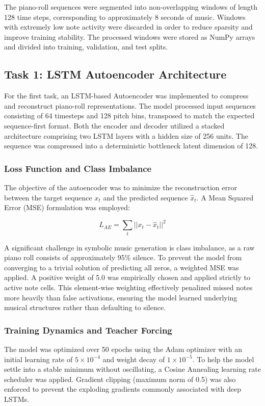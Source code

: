 \documentclass{article}
\theoremstyle{plain}
\theoremstyle{definition}
\theoremstyle{remark}
\begin{document}
The piano-roll sequences were segmented into non-overlapping windows of length 128 time steps, corresponding to approximately 8 seconds of music. Windows with extremely low note activity were discarded in order to reduce sparsity and improve training stability. The processed windows were stored as NumPy arrays and divided into training, validation, and test splits.

\subsection{Task 1: LSTM Autoencoder Architecture}

For the first task, an LSTM-based Autoencoder \cite{hochreiter1997lstm} was implemented to compress and reconstruct piano-roll representations. The model processed input sequences consisting of 64 timesteps and 128 pitch bins, transposed to match the expected sequence-first format. Both the encoder and decoder utilized a stacked architecture comprising two LSTM layers with a hidden size of 256 units. The sequence was compressed into a deterministic bottleneck latent dimension of 128.

\subsubsection{Loss Function and Class Imbalance}

The objective of the autoencoder was to minimize the reconstruction error between the target sequence $x_t$ and the predicted sequence $\hat{x}_t$. A Mean Squared Error (MSE) formulation was employed:

$$
L_{AE} = \sum_t || x_t - \hat{x}_t ||^2
$$

A significant challenge in symbolic music generation is class imbalance, as a raw piano roll consists of approximately 95\% silence. To prevent the model from converging to a trivial solution of predicting all zeros, a weighted MSE was applied. A positive weight of 5.0 was empirically chosen and applied strictly to active note cells. This element-wise weighting effectively penalized missed notes more heavily than false activations, ensuring the model learned underlying musical structures rather than defaulting to silence.

\subsubsection{Training Dynamics and Teacher Forcing}

The model was optimized over 50 epochs using the Adam optimizer with an initial learning rate of $5 \times 10^{-4}$ and weight decay of $1 \times 10^{-5}$. To help the model settle into a stable minimum without oscillating, a Cosine Annealing learning rate scheduler was applied. Gradient clipping (maximum norm of 0.5) was also enforced to prevent the exploding gradients commonly associated with deep LSTMs.
\end{document}
